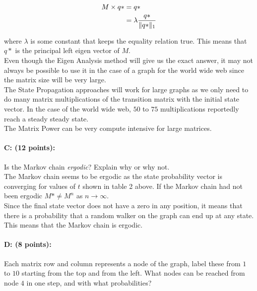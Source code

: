 \documentclass[11pt]{article}
\begin{document}
\begin{equation*}
\begin{aligned}
M \times q* &=  q*\\
&= \lambda  \frac{q*}{\lVert q*\rVert_1}
\end{aligned}
\end{equation*}

where $\lambda$ is some constant that keeps the equality relation true. This means that $q*$ is the principal left eigen vector of $M$.\\

Even though the Eigen Analysis method will give us the exact answer, it may not always be possible to use it in the case of a graph for the world wide web since the matrix size will be very large.\\

The State Propagation approaches will work for large graphs as we only need to do many matrix multiplications of the transition matrix with the initial state vector. In the case of the world wide web, $50$ to $75$ multiplications reportedly reach a steady steady state.\\

The Matrix Power can be very compute intensive for large matrices.

\paragraph{C: (12 points):} 

Is the Markov chain \textit{ergodic}? Explain why or why not.\\

The Markov chain seems to be ergodic as the state probability vector is converging for values of $t$ shown in table 2 above. If the Markov chain had not been ergodic $M* \neq M^n$ as $n \rightarrow \infty$. \\

Since the final state vector does not have a zero in any position, it means that there is a probability that a random walker on the graph can end up at any state. This means that the Markov chain is ergodic.

\paragraph{D: (8 points):} 
Each matrix row and column represents a node of the graph, label these from $1$ to $10$ starting from the top and from the left. What nodes can be reached from node $4$ in one step, and with what probabilities?
\end{document}
